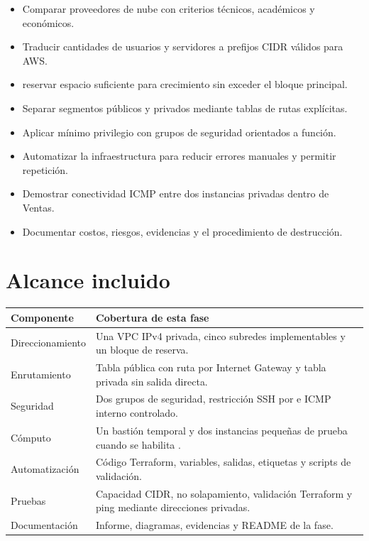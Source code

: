 \begin{itemize}
  \item Comparar proveedores de nube con criterios técnicos, académicos y económicos.
  \item Traducir cantidades de usuarios y servidores a prefijos CIDR válidos para AWS.
  \item reservar espacio suficiente para crecimiento sin exceder el bloque principal.
  \item Separar segmentos públicos y privados mediante tablas de rutas explícitas.
  \item Aplicar mínimo privilegio con grupos de seguridad orientados a función.
  \item Automatizar la infraestructura para reducir errores manuales y permitir repetición.
  \item Demostrar conectividad ICMP entre dos instancias privadas dentro de Ventas.
  \item Documentar costos, riesgos, evidencias y el procedimiento de destrucción.
\end{itemize}

\section{Alcance incluido}

\begin{tabularx}{\textwidth}{p{4.4cm}Y}
\toprule
\textbf{Componente} & \textbf{Cobertura de esta fase} \\
\midrule
Direccionamiento & Una VPC IPv4 privada, cinco subredes implementables y un bloque de reserva. \\
Enrutamiento & Tabla pública con ruta por Internet Gateway y tabla privada sin salida directa. \\
Seguridad & Dos grupos de seguridad, restricción SSH por  e ICMP interno controlado. \\
Cómputo & Un bastión temporal y dos instancias pequeñas de prueba cuando se habilita . \\
Automatización & Código Terraform, variables, salidas, etiquetas y scripts de validación. \\
Pruebas & Capacidad CIDR, no solapamiento, validación Terraform y ping mediante direcciones privadas. \\
Documentación & Informe, diagramas, evidencias y README de la fase. \\
\bottomrule
\end{tabularx}

